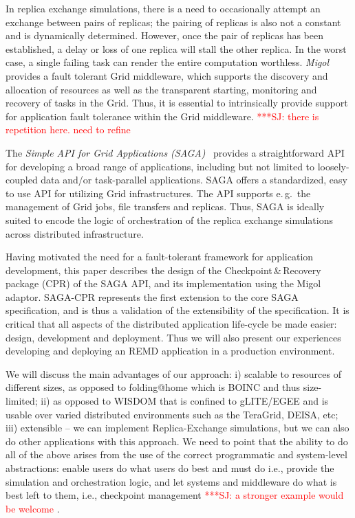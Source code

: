 \documentclass[times, 10pt,twocolumn]{article}
\newcommand{\jhanote}[1]{ {\textcolor{red} { ***SJ: #1 }}}
\newcommand{\jhanote}[1]{}
\begin{document}
In replica exchange simulations, there is a need to occasionally
attempt an exchange between pairs of replicas; the pairing of replicas
is also not a constant and is dynamically determined. However, once
the pair of replicas has been established, a delay or loss of one
replica will stall the other replica. In the worst case, a single
failing task can render the entire computation worthless.
\emph{Migol}~\cite{schnorLuckow08} provides a fault tolerant Grid
middleware, which supports the discovery and allocation of resources
as well as the transparent starting, monitoring and recovery of tasks
in the Grid.  Thus, it is essential to intrinsically provide support
for application fault tolerance within the Grid middleware.
\jhanote{there is repetition here. need to refine}

The \emph{Simple API for Grid Applications (SAGA)}~\cite{saga_gfd90}
provides a straightforward API for developing a broad range of
applications, including but not limited to loosely-coupled data and/or
task-parallel applications.
SAGA offers a standardized, easy to use API for utilizing Grid
infrastructures. The API supports e.\,g.\ the management of Grid jobs,
file transfers and replicas. Thus, SAGA is ideally suited to encode
the logic of orchestration of the replica exchange simulations across
distributed infrastructure.

Having motivated the need for a fault-tolerant framework for
application development, this paper describes the design of the
Checkpoint\,\&\,Recovery package (CPR) of the SAGA API, and its
implementation using the Migol adaptor. SAGA-CPR represents the first
extension to the core SAGA specification, and is thus a validation of
the extensibility of the specification.  It is critical that all
aspects of the distributed application life-cycle be made easier:
design, development and deployment. Thus we will also present our
experiences developing and deploying an REMD application in a
production environment.

We will discuss the main advantages of our approach: i) scalable to
resources of different sizes, as opposed to folding@home which is
BOINC and thus size-limited; ii) as opposed to WISDOM that is confined
to gLITE/EGEE and is usable over varied distributed environments such
as the TeraGrid, DEISA, etc; iii) extensible -- we can implement
Replica-Exchange simulations, but we can also do other applications
with this approach. We need to point that the ability to do all of the
above arises from the use of the correct programmatic and system-level
abstractions: enable users do what users do best and must do i.e.,
provide the simulation and orchestration logic, and let systems and
middleware do what is best left to them, i.e., checkpoint management
\jhanote{a stronger example would be welcome}.
\end{document}
